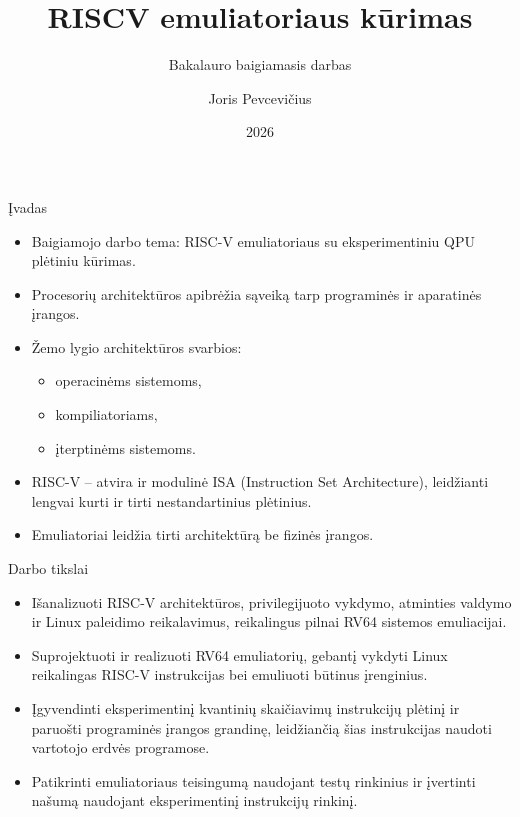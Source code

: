 \documentclass[aspectratio=169]{beamer}
\title{RISCV emuliatoriaus kūrimas}
\subtitle{Bakalauro baigiamasis darbas}
\author{Joris Pevcevičius}
\institute{Bakalauro baigiamasis darbas}
\date{2026}
\begin{document}
\begin{frame}
    \titlepage
\end{frame}

\begin{frame}{Įvadas}
\begin{itemize}
    \item Baigiamojo darbo tema: RISC-V emuliatoriaus su eksperimentiniu QPU plėtiniu kūrimas.
    \item Procesorių architektūros apibrėžia sąveiką tarp programinės ir aparatinės įrangos.
    \item Žemo lygio architektūros svarbios:
    \begin{itemize}
        \item operacinėms sistemoms,
        \item kompiliatoriams,
        \item įterptinėms sistemoms.
    \end{itemize}
    \item RISC-V – atvira ir modulinė ISA (Instruction Set Architecture), leidžianti lengvai kurti ir tirti nestandartinius plėtinius.
    \item Emuliatoriai leidžia tirti architektūrą be fizinės įrangos.
\end{itemize}
\end{frame}

\begin{frame}{Darbo tikslai}
    \begin{itemize}
        \item Išanalizuoti RISC-V architektūros, privilegijuoto vykdymo, atminties valdymo ir Linux paleidimo reikalavimus, reikalingus pilnai RV64 sistemos emuliacijai.
        \item Suprojektuoti ir realizuoti RV64 emuliatorių, gebantį vykdyti Linux reikalingas RISC-V instrukcijas bei emuliuoti būtinus įrenginius.
        \item Įgyvendinti eksperimentinį kvantinių skaičiavimų instrukcijų plėtinį ir paruošti programinės įrangos grandinę, leidžiančią šias instrukcijas naudoti vartotojo erdvės programose.
        \item Patikrinti emuliatoriaus teisingumą naudojant testų rinkinius ir įvertinti našumą naudojant eksperimentinį instrukcijų rinkinį.
    \end{itemize}
\end{frame}
\end{document}
